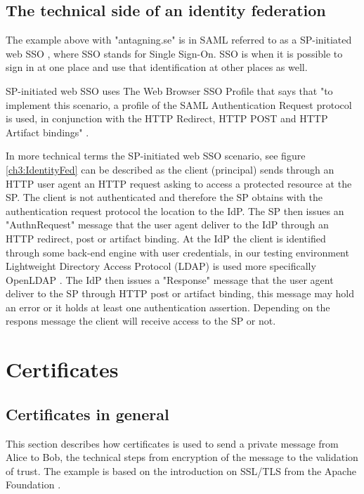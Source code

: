 \subsection{The technical side of an identity federation}
The example above with "antagning.se" is in SAML referred to as a SP-initiated web SSO  \cite[p.~12]{pdf:oasis-open}, 
where SSO stands for Single Sign-On. SSO is when it is possible to sign in at one place and use that identification at other places as well. 

SP-initiated web SSO uses The Web Browser SSO Profile that says that "to implement this scenario,
a profile of the SAML Authentication Request protocol is used, in conjunction with the HTTP Redirect, HTTP POST and
HTTP Artifact bindings" \cite[p.~14]{pdf:oasis-open-profiles}.

In more technical terms the SP-initiated web SSO scenario, see figure \ref{ch3:IdentityFed} can be described as the client (principal) sends through an HTTP user agent
an HTTP request asking to access a protected resource at the SP. The client is not authenticated and therefore the SP
obtains with the authentication request protocol the location to the IdP. The SP then issues an "AuthnRequest" message
that the user agent deliver to the IdP through an HTTP redirect, post or artifact binding.
At the IdP the client is identified through some back-end engine with user credentials, in
our testing environment Lightweight Directory Access Protocol (LDAP) is used more specifically OpenLDAP \cite{website:openldap}.
The IdP then issues a "Response" message that the user agent deliver to the SP through HTTP post or artifact binding,
this message may hold an error or it holds at least one authentication assertion. Depending on the respons message the client will
receive access to the SP or not. \cite[p.~15]{pdf:oasis-open-profiles}
\section{Certificates}
\subsection{Certificates in general}

This section describes how certificates is used to send a private message from Alice to Bob, the technical steps from encryption 
of the message to the validation of trust.
The example is based on the introduction on SSL/TLS from the Apache Foundation \cite{website:ssl_intro}.

